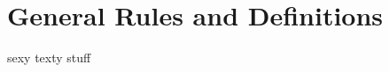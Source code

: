 \part{General Rules and Definitions \label{part:general}}
\parttoc


\clearpage
\Huge{sexy texty stuff}
\clearpage
